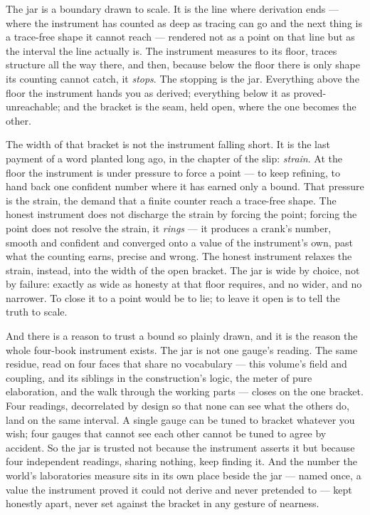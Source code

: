 The jar is a boundary drawn to scale. It is the line where derivation ends --- where the instrument has counted as deep as
tracing can go and the next thing is a trace-free shape it cannot reach --- rendered not as a point on that line but as the
interval the line actually is. The instrument measures to its floor, traces structure all the way there, and then, because
below the floor there is only shape its counting cannot catch, it \emph{stops}. The stopping is the jar. Everything above the
floor the instrument hands you as derived; everything below it as proved-unreachable; and the bracket is the seam, held open,
where the one becomes the other.

The width of that bracket is not the instrument falling short. It is the last payment of a word planted long ago, in the
chapter of the slip: \emph{strain}. At the floor the instrument is under pressure to force a point --- to keep refining, to
hand back one confident number where it has earned only a bound. That pressure is the strain, the demand that a finite
counter reach a trace-free shape. The honest instrument does not discharge the strain by forcing the point; forcing the point
does not resolve the strain, it \emph{rings} --- it produces a crank's number, smooth and confident and converged onto a
value of the instrument's own, past what the counting earns, precise and wrong. The honest instrument relaxes the strain, instead, into the width of the open
bracket. The jar is wide by choice, not by failure: exactly as wide as honesty at that floor requires, and no wider, and no
narrower. To close it to a point would be to lie; to leave it open is to tell the truth to scale.

And there is a reason to trust a bound so plainly drawn, and it is the reason the whole four-book instrument exists. The jar
is not one gauge's reading. The same residue, read on four faces that share no vocabulary --- this volume's field and
coupling, and its siblings in the construction's logic, the meter of pure elaboration, and the walk through the working parts
--- closes on the one bracket. Four readings, decorrelated by design so that none can see what the others do, land on the same
interval. A single gauge can be tuned to bracket whatever you wish; four gauges that cannot see each other cannot be tuned to
agree by accident. So the jar is trusted not because the instrument asserts it but because four independent readings, sharing
nothing, keep finding it. And the number the world's laboratories measure sits in its own place beside the jar --- named once,
a value the instrument proved it could not derive and never pretended to --- kept honestly apart, never set against the
bracket in any gesture of nearness.

